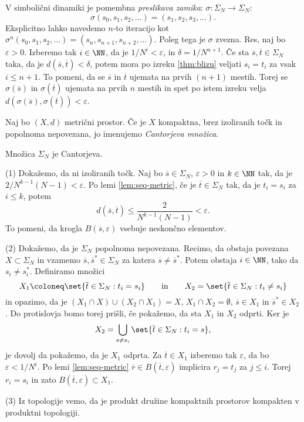 V simbolični dinamiki je pomembna \emph{preslikava zamika}: \(\sigma \colon \Sigma_N \to \Sigma_N\):
\[\sigma (s_0, s_1, s_2, \dots) = (s_1, s_2, s_3, \dots).\]
Eksplicitno lahko navedemo \(n\)-to iteracijo kot \(\sigma^n (s_0, s_1, s_2, \dots) = (s_n, s_{n + 1}, s_{n + 2}, \dots)\). Poleg tega je \(\sigma\) zvezna. Res, naj bo \(\varepsilon > 0\). Izberemo tak \(i \in \NN\), da je \(1 / N^i < \varepsilon\), in \(\delta = 1 / N^{n + 1}\). Če sta \(\overline{s}, \overline{t} \in \Sigma_N\) taka, da je \(d(\overline{s}, \overline{t}) < \delta\), potem mora po izreku \ref{thm:blizu} veljati \(s_i = t_i\) za vsak \(i \leq n + 1\). To pomeni, da se \(\overline{s}\) in \(\overline{t}\) ujemata na prvih \((n + 1)\) mestih. Torej se \(\sigma (\overline{s})\) in \(\sigma (\overline{t})\) ujemata na prvih \(n\) mestih in spet po istem izreku velja \(d (\sigma (\overline{s}), \sigma (\overline{t})) < \varepsilon\).

\begin{definicija}
    Naj bo \((X, d)\) metrični prostor. Če je \(X\) kompaktna, brez izoliranih točk in popolnoma nepovezana, jo imenujemo \emph{Cantorjeva množica}.
\end{definicija}

\begin{trditev}
    Množica \(\Sigma_N\) je Cantorjeva.
\end{trditev}

\begin{dokaz}
    (1) Dokažemo, da ni izoliranih točk. Naj bo \(\overline{s} \in \Sigma_N\), \(\varepsilon > 0\) in \(k \in \NN\) tak, da je \(2/N^{k - 1} (N -1) < \varepsilon\). Po lemi \ref{lem:seq-metric}, če je \(\overline{t} \in \Sigma_N\) tak, da je \(t_i = s_i\) za \(i \leq k\), potem
    \[d (\overline{s}, \overline{t}) \leq \frac{2}{N^{k - 1} (N - 1)} < \varepsilon.\]
    To pomeni, da krogla \(B (\overline{s}, \varepsilon)\) vsebuje neskončno elementov.

    (2) Dokažemo, da je \(\Sigma_N\) popolnoma nepovezana. Recimo, da obstaja povezana \(X \subset \Sigma_N\) in vzamemo \(\overline{s}, \overline{s}^* \in \Sigma_N\) za katera \(\overline{s} \neq \overline{s}^*\). Potem obstaja \(i \in \NN\), tako da \(s_i \neq s_i^*\). Definiramo množici
    \[X_1 \coloneq \set{\overline{t} \in \Sigma_N : t_i = s_i} \qquad \text{in} \qquad X_2 = \set{\overline{t} \in \Sigma_N : t_i \neq s_i}\]
    in opazimo, da je \((X_1 \cap X) \cup (X_2 \cap X_1) = X\), \(X_1 \cap X_2 = \emptyset\), \(\overline{s} \in X_1\) in \(\overline{s}^* \in X_2\). Do protislovja bomo torej prišli, če pokažemo, da sta \(X_1\) in \(X_2\) odprti. Ker je
    \[X_2 = \bigcup_{s \neq s_i} \set{\overline{t} \in \Sigma_N : t_i = s},\]
    je dovolj da pokažemo, da je \(X_1\) odprta. Za \(\overline{t} \in X_1\) izberemo tak \(\varepsilon\), da bo \(\varepsilon < 1 / N^i\). Po lemi \ref{lem:seq-metric} \(\overline{r} \in B (\overline{t}, \varepsilon)\) implicira \(r_j = t_j\) za \(j \leq i\). Torej \(r_i = s_i\) in zato \(B (\overline{t}, \varepsilon) \subset X_1\).

    (3) Iz topologije vemo, da je produkt družine kompaktnih prostorov kompakten v produktni topologiji.
\end{dokaz}

